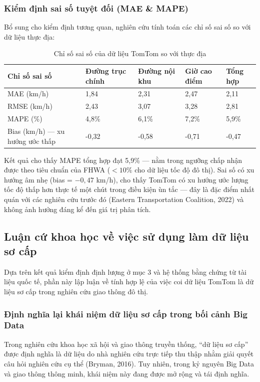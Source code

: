 \subsubsection{Kiểm định sai số tuyệt đối (MAE \& MAPE)}
Bổ sung cho kiểm định tương quan, nghiên cứu tính toán các chỉ số sai số so với dữ liệu thực địa:

\begin{table}[H]
\centering
\caption{Chỉ số sai số của dữ liệu TomTom so với thực địa}
\begin{tabular}{|p{4cm}|p{3cm}|p{3cm}|p{2.5cm}|p{2cm}|}
\hline
\textbf{Chỉ số sai số} & \textbf{Đường trục chính} & \textbf{Đường nội khu} & \textbf{Giờ cao điểm} & \textbf{Tổng hợp} \\
\hline
MAE (km/h) & 1,84 & 2,31 & 2,47 & 2,11 \\
\hline
RMSE (km/h) & 2,43 & 3,07 & 3,28 & 2,81 \\
\hline
MAPE (\%) & 4,8\% & 6,1\% & 7,2\% & 5,9\% \\
\hline
Bias (km/h) --- xu hướng ước thấp & -0,32 & -0,58 & -0,71 & -0,47 \\
\hline
\end{tabular}
\end{table}

Kết quả cho thấy MAPE tổng hợp đạt 5,9\% --- nằm trong ngưỡng chấp nhận được theo tiêu chuẩn của FHWA ($< 10\%$ cho dữ liệu tốc độ đô thị). Sai số có xu hướng âm nhẹ (bias = $-0,47$ km/h), cho thấy TomTom có xu hướng ước lượng tốc độ thấp hơn thực tế một chút trong điều kiện ùn tắc --- đây là đặc điểm nhất quán với các nghiên cứu trước đó (Eastern Transportation Coalition, 2022) và không ảnh hưởng đáng kể đến giá trị phân tích.

\subsection{Luận cứ khoa học về việc sử dụng làm dữ liệu sơ cấp}
Dựa trên kết quả kiểm định định lượng ở mục 3 và hệ thống bằng chứng từ tài liệu quốc tế, phần này lập luận về tính hợp lệ của việc coi dữ liệu TomTom là dữ liệu sơ cấp trong nghiên cứu giao thông đô thị.

\subsubsection{Định nghĩa lại khái niệm dữ liệu sơ cấp trong bối cảnh Big Data}
Trong nghiên cứu khoa học xã hội và giao thông truyền thống, ``dữ liệu sơ cấp'' được định nghĩa là dữ liệu do nhà nghiên cứu trực tiếp thu thập nhằm giải quyết câu hỏi nghiên cứu cụ thể (Bryman, 2016). Tuy nhiên, trong kỷ nguyên Big Data và giao thông thông minh, khái niệm này đang được mở rộng và tái định nghĩa.

